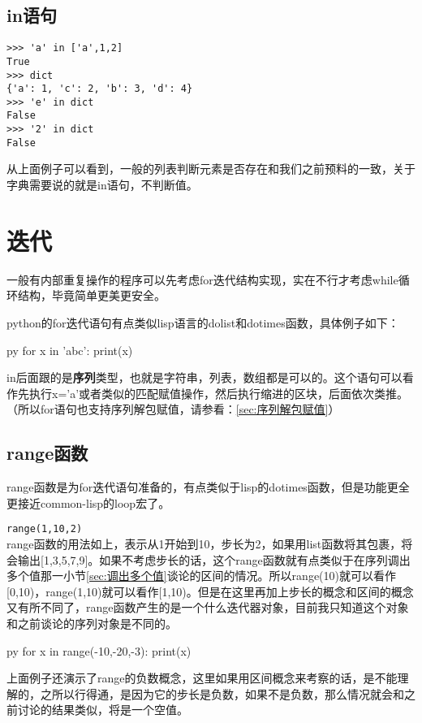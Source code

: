 \documentclass[12pt,oneside]{book}
\begin{document}
\begin{common-format}
\subsection{in语句}
\begin{Verbatim}
>>> 'a' in ['a',1,2]
True
>>> dict
{'a': 1, 'c': 2, 'b': 3, 'd': 4}
>>> 'e' in dict
False
>>> '2' in dict
False
\end{Verbatim}
从上面例子可以看到，一般的列表判断元素是否存在和我们之前预料的一致，关于字典需要说的就是in语句，不判断值。






\section{迭代}
一般有内部重复操作的程序可以先考虑for迭代结构实现，实在不行才考虑while循环结构，毕竟简单更美更安全。

python的for迭代语句有点类似lisp语言的dolist和dotimes函数，具体例子如下：
\begin{xverbatim}[129]{py}
for x in 'abc':
    print(x)
\end{xverbatim}
in后面跟的是\textbf{序列}类型，也就是字符串，列表，数组都是可以的。这个语句可以看作先执行x='a'或者类似的匹配赋值操作，然后执行缩进的区块，后面依次类推。（所以for语句也支持序列解包赋值，请参看：\ref{sec:序列解包赋值}）


\subsection{range函数}
range函数是为for迭代语句准备的，有点类似于lisp的dotimes函数，但是功能更全更接近common-lisp的loop宏了。

\verb+range(1,10,2)+\\
range函数的用法如上，表示从1开始到10，步长为2，如果用list函数将其包裹，将会输出[1,3,5,7,9]。如果不考虑步长的话，这个range函数就有点类似于在序列调出多个值那一小节\ref{sec:调出多个值}谈论的区间的情况。所以range(10)就可以看作[0,10)，range(1,10)就可以看作[1,10)。但是在这里再加上步长的概念和区间的概念又有所不同了，range函数产生的是一个什么迭代器对象，目前我只知道这个对象和之前谈论的序列对象是不同的。

\begin{xverbatim}[129]{py}
for x in range(-10,-20,-3):
    print(x)
\end{xverbatim}
上面例子还演示了range的负数概念，这里如果用区间概念来考察的话，是不能理解的，之所以行得通，是因为它的步长是负数，如果不是负数，那么情况就会和之前讨论的结果类似，将是一个空值。



\end{common-format}
\end{document}
